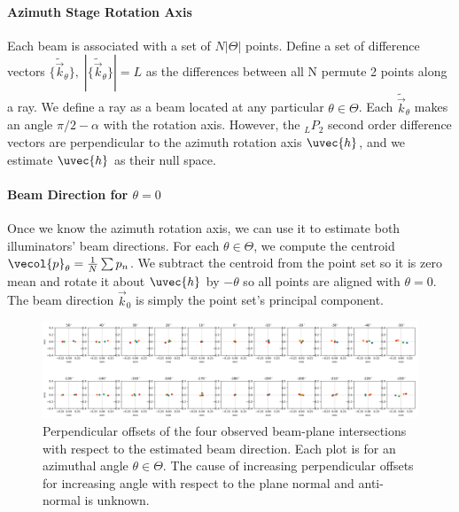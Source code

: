 \paragraph{Azimuth Stage Rotation Axis}
Each beam is associated with a set of $N|\Theta|$ points. Define a set of difference vectors $\{\tilde{\vec{k}}_\theta\}, \; |\{\tilde{\vec{k}}_\theta\}| = L$ as the differences between all N permute 2 points along a ray. We define a ray as a beam located at any particular $\theta \in \Theta$. Each $\tilde{\vec{k}}_\theta$ makes an angle $\pi/2 - \alpha$ with the rotation axis. However, the $_L P_2$ second order difference vectors are perpendicular to the azimuth rotation axis $\uvec{h}$, and we estimate $\uvec{h}$ as their null space.

\paragraph{Beam Direction for $\theta = 0$}
Once we know the azimuth rotation axis, we can use it to estimate both illuminators' beam directions. For each $\theta \in \Theta$, we compute the centroid $\vecol{p}_\theta = \frac{1}{N} \sum p_n$. We subtract the centroid from the point set so it is zero mean and rotate it about $\uvec{h}$ by $-\theta$ so all points are aligned with $\theta = 0$. The beam direction $\vec{k}_0$ is simply the point set's principal component.
%
\begin{figure}
    \centering
    \includegraphics[width=1\linewidth]{../figures/beam_direction_fits.png}
    \caption{Perpendicular offsets of the four observed beam-plane intersections with respect to the estimated beam direction. Each plot is for an azimuthal angle $\theta \in \Theta$. The cause of increasing perpendicular offsets for increasing angle with respect to the plane normal and anti-normal is unknown.}
    \label{fig:beam_direction_plane_points}
\end{figure}

